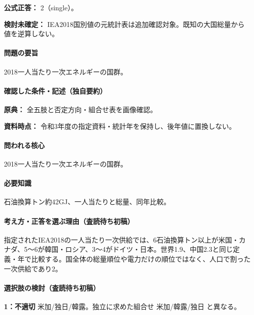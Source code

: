 \textbf{公式正答：} 2（single）。

\par\textbf{検討未確定：} IEA2018国別値の元統計表は追加確認対象。既知の大国総量から値を逆算しない。

\paragraph{問題の要旨} 2018一人当たり一次エネルギーの国群。

\paragraph{確認した条件・記述（独自要約）}\mbox{}\par

\noindent\textbf{原典：} 全五肢と否定方向・組合せ表を画像確認。\par

\noindent\textbf{資料時点：} 令和3年度の指定資料・統計年を保持し、後年値に置換しない。\par

\paragraph{問われる核心} 2018一人当たり一次エネルギーの国群。

\paragraph{必要知識} 石油換算トン約42GJ、一人当たりと総量、同年比較。

\paragraph{考え方・正答を選ぶ理由（査読待ち初稿）} 指定されたIEA2018の一人当たり一次供給では、6石油換算トン以上が米国・カナダ、5〜6が韓国・ロシア、3〜4がドイツ・日本。世界1.9、中国2.3と同じ定義・年で比較する。国全体の総量順位や電力だけの順位ではなく、人口で割った一次供給であり2。

\paragraph{選択肢の検討（査読待ち初稿）}\mbox{}\par

\noindent\textbf{1：不適切} 米加/独日/韓露。独立に求めた組合せ 米加/韓露/独日 と異なる。\par

